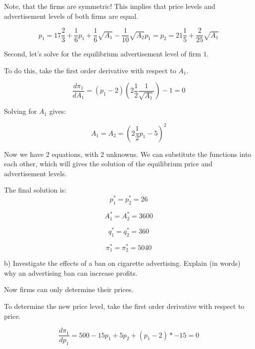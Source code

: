 \documentclass[12pt,english]{article}%
\begin{document}
Note, that the firms are symmetric! This implies that price levels and advertisement levels of both firms are equal. 

\begin{equation}
p_1=17\frac{2}{3}+\frac{1}{6}p_1+\frac{1}{6}\sqrt{A_1}-\frac{1}{10}\sqrt{A_2}
p_1=p_2=21\frac{1}{5}+\frac{2}{25}\sqrt{A_1}
\end{equation}

Second, let's solve for the equilibrium advertisement level of firm $1$.

To do this, take the first order derivative with respect to $A_1$.

\begin{equation}
\frac{d\pi_1}{dA_1}=(p_1-2)(2\frac{1}{2}\frac{1}{\sqrt{A_1}})-1=0
\end{equation}

Solving for $A_1$ gives:

\begin{equation}
A_1=A_2=(2\frac{1}{2}p_1-5)^2
\end{equation}

Now we have 2 equations, with 2 unknowns. We can substitute the functions into each other, which will gives the solution of the equilibrium price and advertisement levels. 

The final solution is:
\begin{equation}
p_1^*=p_2^*=26
\end{equation}

\begin{equation}
A_1^*=A_2^*=3600
\end{equation}

\begin{equation}
q_1^*=q_2^*=360
\end{equation}

\begin{equation}
\pi_1^*=\pi_2^*=5040
\end{equation}

b) Investigate the effects of a ban on cigarette advertising. Explain (in words) why an advertising ban can increase profits. 

Now firms can only determine their prices. 

To determine the new price level, take the first order derivative with respect to price. 

\begin{equation}
\frac{d\pi_1}{dp_1}=500-15p_1+5p_2+(p_1-2)*-15=0
\end{equation}
\end{document}
